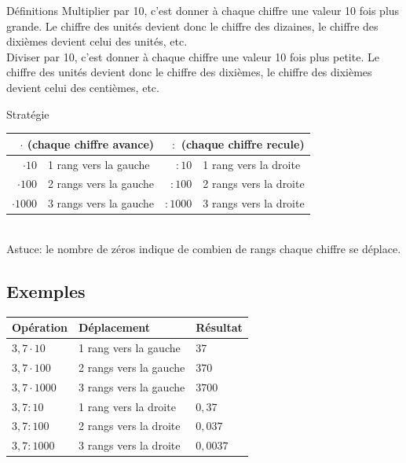 \begin{regle}{Définitions}
\textcolor{themeColor}{Multiplier} par 10, c'est donner à chaque chiffre une valeur 10 fois plus grande. Le chiffre des unités devient donc le chiffre des dizaines, le chiffre des dixièmes devient celui des unités, etc.\\[7pt]
\textcolor{themeColor}{Diviser} par 10, c'est donner à chaque chiffre une valeur 10 fois plus petite. Le chiffre des unités devient donc le chiffre des dixièmes, le chiffre des dixièmes devient celui des centièmes, etc.
\end{regle}

\vspace{10pt}\begin{astuce}{Stratégie}

\def\arraystretch{1}
\vspace{-10pt}\begin{tabularx}{\linewidth}{rX|rX}
\multicolumn{2}{C|}{$\cdot$ (chaque chiffre avance)}& \multicolumn{2}{C}{$:$ (chaque chiffre recule) }\\\hline
$\cdot 10$ & 1 rang vers la gauche & $: 10$ &1 rang vers la droite \\
$\cdot 100$ & 2 rangs vers la gauche & $: 100$ & 2 rangs vers la droite \\
$\cdot 1000$ & 3 rangs vers la gauche & $: 1000$ & 3 rangs vers la droite \\
\end{tabularx}
\def\arraystretch{1}
\\[8pt]
Astuce: le nombre de zéros indique de combien de rangs chaque chiffre se déplace.
\end{astuce}


\vspace{10pt}
\subsection{Exemples}
\def\arraystretch{1.05}
\begin{tabularx}{\linewidth}{|X|X|X|}
\hline
\cellcolor{themeNO!30}\textbf{Opération} & \cellcolor{themeNO!30}\textbf{Déplacement} & \cellcolor{themeNO!30}\textbf{Résultat} \\\hline
$3,7 \cdot 10$ & 1 rang vers la gauche & $37$ \\\hline
$3,7 \cdot 100$ & 2 rangs vers la gauche  & $370$ \\\hline
$3,7 \cdot 1000$ & 3 rangs vers la gauche  & $3700$ \\\hline
$3,7 : 10$ & 1 rang vers la droite & $0,37$ \\\hline
$3,7 : 100$ & 2 rangs vers la droite & $0,037$ \\\hline
$3,7 : 1000$ & 3 rangs vers la droite & $0,0037$ \\\hline
\end{tabularx}
\def\arraystretch{1}

